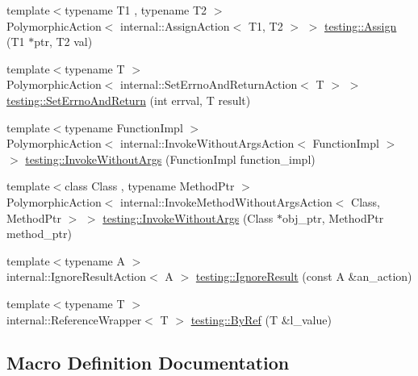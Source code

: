 \begin{DoxyCompactItemize}
\item 
{\footnotesize template$<$typename T1 , typename T2 $>$ }\\Polymorphic\+Action$<$ internal\+::\+Assign\+Action$<$ T1, T2 $>$ $>$ \mbox{\hyperlink{namespacetesting_a630f14770743960d9d1b7c71cfd9034c}{testing\+::\+Assign}} (T1 $\ast$ptr, T2 val)
\item 
{\footnotesize template$<$typename T $>$ }\\Polymorphic\+Action$<$ internal\+::\+Set\+Errno\+And\+Return\+Action$<$ T $>$ $>$ \mbox{\hyperlink{namespacetesting_a6f466024040fa05349773514ce1c6647}{testing\+::\+Set\+Errno\+And\+Return}} (int errval, T result)
\item 
{\footnotesize template$<$typename Function\+Impl $>$ }\\Polymorphic\+Action$<$ internal\+::\+Invoke\+Without\+Args\+Action$<$ Function\+Impl $>$ $>$ \mbox{\hyperlink{namespacetesting_a88cc1999296bc630f6a49cdf66bb21f9}{testing\+::\+Invoke\+Without\+Args}} (Function\+Impl function\+\_\+impl)
\item 
{\footnotesize template$<$class Class , typename Method\+Ptr $>$ }\\Polymorphic\+Action$<$ internal\+::\+Invoke\+Method\+Without\+Args\+Action$<$ Class, Method\+Ptr $>$ $>$ \mbox{\hyperlink{namespacetesting_ab75325d71a8c37db94f349243815c728}{testing\+::\+Invoke\+Without\+Args}} (Class $\ast$obj\+\_\+ptr, Method\+Ptr method\+\_\+ptr)
\item 
{\footnotesize template$<$typename A $>$ }\\internal\+::\+Ignore\+Result\+Action$<$ A $>$ \mbox{\hyperlink{namespacetesting_a257c9395b54e9267a0348a6310128889}{testing\+::\+Ignore\+Result}} (const A \&an\+\_\+action)
\item 
{\footnotesize template$<$typename T $>$ }\\internal\+::\+Reference\+Wrapper$<$ T $>$ \mbox{\hyperlink{namespacetesting_aaee6d42dcd69de6e7a1459c5c71222c3}{testing\+::\+By\+Ref}} (T \&l\+\_\+value)
\end{DoxyCompactItemize}


\subsection{Macro Definition Documentation}
\mbox{\label{_obj__test_2lib_2googletest-release-1_88_81_2googlemock_2include_2gmock_2gmock-actions_8h_a06b1e6cd1145acf7849e4a112976016b}} 
